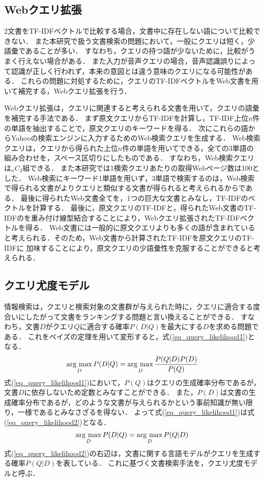 \subsection{Webクエリ拡張}   \label{sec_webquery}
2文書をTF-IDFベクトルで比較する場合，文書中に存在しない語について比較できない．
また本研究で扱う文書検索の問題において，一般にクエリは短く，少語彙であることが多い．
すなわち，クエリの持つ語が少ないために，比較がうまく行えない場合がある．
また入力が音声クエリの場合，音声認識誤りによって認識が正しく行われず，本来の意図とは違う意味のクエリになる可能性がある．
これらの問題に対処するために，クエリのTF-IDFベクトルをWeb文書を用いて補完する，Webクエリ拡張を行う．

Webクエリ拡張は，クエリに関連すると考えられる文書を用いて，クエリの語彙を補完する手法である．
まず原文クエリからTF-IDFを計算し，TF-IDF上位$n$件の単語を抽出することで，原文クエリのキーワードを得る．
次にこれらの語からYahooの検索エンジンに入力するためのWeb検索クエリを生成する．
Web検索クエリは，クエリから得られた上位$n$件の単語を用いてできる，全ての3単語の組み合わせを，スペース区切りにしたものである．
すなわち，Web検索クエリは$_n C _3$組できる．
また本研究では1検索クエリあたりの取得Webページ数は100とした．
Web検索にキーワード1単語を用いず，3単語で検索するのは，Web検索で得られる文書がよりクエリと類似する文書が得られると考えられるからである．
最後に得られたWeb文書全てを，1つの巨大な文書とみなし，TF-IDFのベクトルを計算する．
最後に，原文クエリのTF-IDFと，得られたWeb文書のTF-IDFのを重み付け線型結合することにより，Webクエリ拡張されたTF-IDFベクトルを得る．
Web文書には一般的に原文クエリよりも多くの語が含まれていると考えられる．そのため，Web文書から計算されたTF-IDFを原文クエリのTF-IDFに
加味することにより，原文クエリの少語彙性を克服することができると考えられる．

\subsection{クエリ尤度モデル}
情報検索は，クエリと検索対象の文書群が与えられた時に，クエリに適合する度合いにしたがって文書をランキングする問題と言い換えることができる．
すなわち，文書$D$がクエリ$Q$に適合する確率$P(D|Q)$を最大にする$D$を求める問題である．
これをベイズの定理を用いて変形すると，式(\ref{eq_query_likelihood1})となる．
\begin{equation}
    \mathop{\rm arg~max}\limits_{D} P(D|Q) = \mathop{\rm arg~max}\limits_{D} \frac{P(Q|D)P(D)}{P(Q)}    \label{eq_query_likelihood1}
\end{equation}
式(\ref{eq_query_likelihood1})において，$P(Q)$はクエリの生成確率分布であるが，文書$D$に依存しないため定数とみなすことができる．
また，$P(D)$は文書の生成確率分布であるが，どのような文書が与えられるかという事前知識が無い限り，一様であるとみなさざるを得ない．
よって式(\ref{eq_query_likelihood1})は式(\ref{eq_query_likelihood2})となる．
\begin{equation}
    \mathop{\rm arg~max}\limits_{D} P(D|Q) = \mathop{\rm arg~max}\limits_{D} P(Q|D) \label{eq_query_likelihood2}
\end{equation}
式(\ref{eq_query_likelihood2})の右辺は，文書に関する言語モデルがクエリを生成する確率$P(Q|D)$を表している．
これに基づく文書検索手法を，クエリ尤度モデルと呼ぶ．

